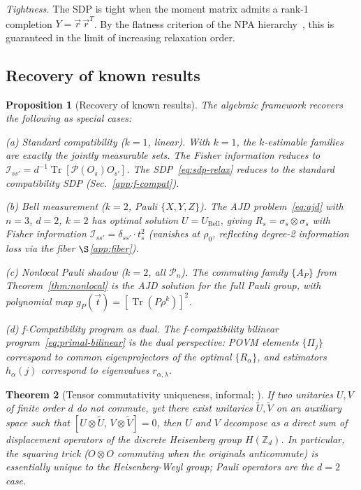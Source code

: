 \documentclass[aps,%
twocolumn,%
floatfix,%
pra,%
amsfonts,%
groupedaddress,%
superscriptaddress]{revtex4-2}%
\newtheorem{theorem}{Theorem}
\newtheorem{proposition}[theorem]{Proposition}
\DeclareMathOperator{\tr}{Tr}
\newcommand{\ox}{\otimes}
\newcommand{\1}{\mathbbm{1}}
\newcommand*{\cP}{\mathcal{P}}
\newcommand*{\cI}{\mathcal{I}}
\begin{document}
\emph{Tightness.} The SDP is tight when the moment matrix admits a rank-1 completion $Y = \vec{r}\,\vec{r}^T$. By the flatness criterion of the NPA hierarchy~\cite{pironio2010convergent}, this is guaranteed in the limit of increasing relaxation order.


\subsection{Recovery of known results}\label{app:recovery}

\begin{proposition}[Recovery of known results]\label{prop:recovery}
The algebraic framework recovers the following as special cases:

\emph{(a) Standard compatibility ($k=1$, linear).}
With $k=1$, the $k$-estimable families are exactly the jointly measurable sets. The Fisher information reduces to $\cI_{ss'} = d^{-1}\tr[\cP(O_s)O_{s'}]$. The SDP~\eqref{eq:sdp-relax} reduces to the standard compatibility SDP (Sec.~\ref{app:f-compat}).

\emph{(b) Bell measurement ($k=2$, Pauli $\{X,Y,Z\}$).}
The AJD problem~\eqref{eq:ajd} with $n=3$, $d=2$, $k=2$ has optimal solution $U = U_{\mathrm{Bell}}$, giving $R_s = \sigma_s \ox \sigma_s$ with Fisher information $\cI_{ss'} = \delta_{ss'}\cdot t_s^2$ (vanishes at $\rho_0$, reflecting degree-2 information loss via the fiber $\S$\ref{app:fiber}).

\emph{(c) Nonlocal Pauli shadow ($k=2$, all $\cP_n$).}
The commuting family $\{A_P\}$ from Theorem~\ref{thm:nonlocal} is the AJD solution for the full Pauli group, with polynomial map $g_P(\vec{t}) = [\tr(P\rho^k)]^2$.

\emph{(d) f-Compatibility program as dual.}
The f-compatibility bilinear program~\eqref{eq:primal-bilinear} is the dual perspective: POVM elements $\{\Pi_j\}$ correspond to common eigenprojectors of the optimal $\{R_\alpha\}$, and estimators $h_\alpha(j)$ correspond to eigenvalues $r_{\alpha,\lambda}$.
\end{proposition}

\begin{theorem}[Tensor commutativity uniqueness, informal; {\cite[Theorem~4]{king2024exponential}}]\label{thm:king-nogo}
If two unitaries $U,V$ of finite order $d$ do not commute, yet there exist unitaries $\tilde{U},\tilde{V}$ on an auxiliary space such that $[U\ox\tilde{U},\,V\ox\tilde{V}]=0$, then $U$ and $V$ decompose as a direct sum of displacement operators of the discrete Heisenberg group $H(\mathbb{Z}_d)$. In particular, the squaring trick ($O \ox O$ commuting when the originals anticommute) is essentially unique to the Heisenberg-Weyl group; Pauli operators are the $d=2$ case.
\end{theorem}
\end{document}
